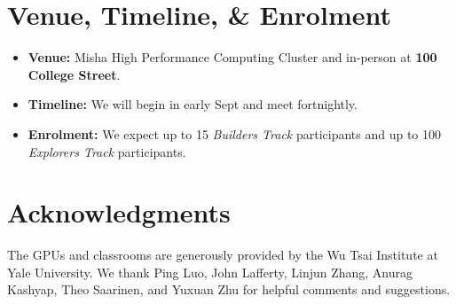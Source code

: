 \documentclass[12pt]{article}
\begin{document}
\section{Venue, Timeline, \& Enrolment}
\begin{itemize}
    \item \textbf{Venue:} Misha High Performance Computing Cluster and in-person at \textbf{100 College Street}.
    \item \textbf{Timeline:} We will begin in early Sept and meet fortnightly.
    \item \textbf{Enrolment:} We expect up to 15 \emph{Builders Track} participants and up to 100 \emph{Explorers Track} participants.
\end{itemize}

\section{Acknowledgments}
The GPUs and classrooms are generously provided by the Wu Tsai Institute at Yale University.  We thank Ping Luo, John Lafferty, Linjun Zhang, Anurag Kashyap, Theo Saarinen, and Yuxuan Zhu for helpful comments and suggestions.  

\appendix

\end{document}
